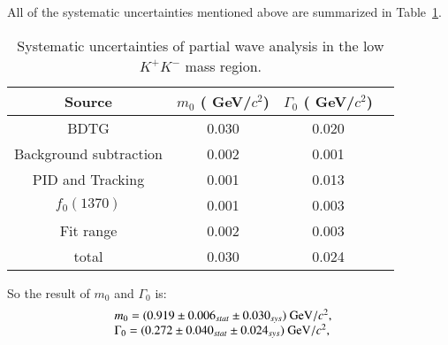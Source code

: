 {    All of the systematic uncertainties mentioned above are summarized in Table~\ref{MIPWA-Sys}.
    \begin{table}[htbp]
        \caption{Systematic uncertainties of partial wave analysis in the low $K^{+}K^{-}$ mass region.}
        \label{MIPWA-Sys}
        \begin{center}
            \begin{tabular}{cccc}
                \toprule\toprule
                Source   &                                                      $m_{0}$ ( GeV/$c^{2}$)  &$\Gamma_{0}$ ( GeV/$c^{2}$)\\
                \hline
                BDTG                     & 0.030                  &   0.020 \\
                Background subtraction   & 0.002                  &   0.001 \\
                PID and Tracking         & 0.001                  &   0.013 \\
                $f_{0}(1370)$            & 0.001                  &   0.003 \\
                Fit range                & 0.002                  &   0.003 \\

                \hline
                total                                   & 0.030                  &   0.024\\
                \bottomrule\bottomrule
            \end{tabular}
        \end{center}
    \end{table}
    So the result of $m_{0}$ and $\Gamma_{0}$ is:
    \begin{equation}
        \begin{array}{lr}
            m_{0} = (0.919 \pm 0.006_{stat} \pm 0.030_{sys}) \ {\rm GeV}/c^{2}, &\\
            \Gamma_{0} = (0.272 \pm 0.040_{stat} \pm 0.024_{sys})\ {\rm GeV}/c^{2}, &
        \end{array}\label{S-wave-sys} 
    \end{equation}

}
